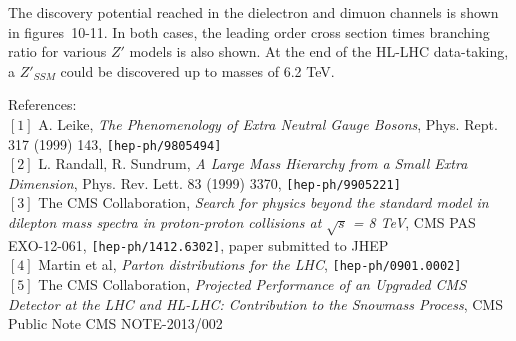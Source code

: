 \documentclass[a0b,portrait,preview]{a0poster}
\begin{document}
\begin{multicols}{3}
The discovery potential reached in the dielectron and dimuon channels is shown in {\darkgreen figures~10-11}.
In both cases, the leading order cross section times branching ratio for various $Z'$ models is also shown.
At the end of the HL-LHC data-taking, a $Z'_{SSM}$ could be discovered up to masses of 6.2 TeV.

\vspace{1.5cm} %
{\darkblue 
References: \\
{\small
$[1]$ A. Leike, \textit{The Phenomenology of Extra Neutral Gauge Bosons}, Phys. Rept. 317 (1999) 143, \verb|[hep-ph/9805494]| \\%
$[2]$ L. Randall, R. Sundrum, \textit{A Large Mass Hierarchy from a Small Extra Dimension}, Phys. Rev. Lett. 83 (1999) 3370, \verb|[hep-ph/9905221]| \\
$[3]$ The CMS Collaboration, \textit{Search for physics beyond the standard model in dilepton mass spectra in proton-proton collisions at $\sqrt{s}$ = 8 TeV}, CMS PAS EXO-12-061, \verb|[hep-ph/1412.6302]|, paper submitted to JHEP \\
$[4]$ Martin et al, \textit{Parton distributions for the LHC}, \verb|[hep-ph/0901.0002]|\\
$[5]$ The CMS Collaboration, \textit{Projected Performance of an Upgraded CMS Detector at the LHC and HL-LHC: Contribution to the Snowmass Process}, CMS Public Note CMS NOTE-2013/002 \\

}
}


\end{multicols}
\end{document}
